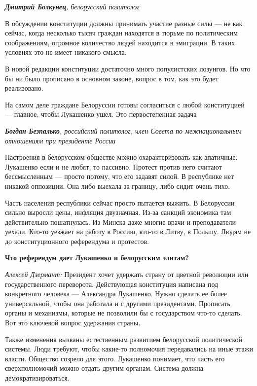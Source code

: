 \textit{\textbf{Дмитрий Болкунец}, белорусский политолог}

В обсуждении конституции должны принимать участие разные силы — не как сейчас, когда несколько тысяч граждан находятся в тюрьме по политическим соображениям, огромное количество людей находится в эмиграции. В таких условиях это не имеет никакого смысла.

В новой редакции конституции достаточно много популистских лозунгов. Но что бы ни было прописано в основном законе, вопрос в том, как это будет реализовано.

\begin{fancyquotes}
    На самом деле граждане Белоруссии готовы согласиться с любой конституцией — главное, чтобы Лукашенко ушел. Это первостепенная задача
\end{fancyquotes}

\textit{\textbf{Богдан Безпалько}, российский политолог, член Совета по межнациональным отношениям при президенте России}

Настроения в белорусском обществе можно охарактеризовать как апатичные. Лукашенко если и не любят, то пассивно. Протест против него считают бессмысленным — просто потому, что его задавят силой. В республике нет никакой оппозиции. Она либо выехала за границу, либо сидит очень тихо.

Часть населения республики сейчас просто пытается выжить. В Белоруссии сильно выросли цены, инфляция двузначная. Из-за санкций экономика там действительно пошатнулась. Из Минска даже многие врачи и преподаватели уехали. Кто-то уезжает на работу в Россию, кто-то в Литву, в Польшу. Людям не до конституционного референдума и протестов.

\textbf{Что референдум дает Лукашенко и белорусским элитам?}

\textit{Алексей Дзермант:} Президент хочет удержать страну от цветной революции или государственного переворота. Действующая конституция написана под конкретного человека — Александра Лукашенко. Нужно сделать ее более универсальной, чтобы она работала и с другими президентами. Прописать органы и механизмы, которые не позволили бы с государством что-то сделать. Вот это ключевой вопрос удержания страны.

Также изменения вызваны естественным развитием белорусской политической системы. Люди требуют, чтобы какие-то полномочия передавались на иные этажи власти. Общество созрело для этого. Лукашенко понимает, что часть его сверхполномочий можно отдать другим органам. Система должна демократизироваться.

